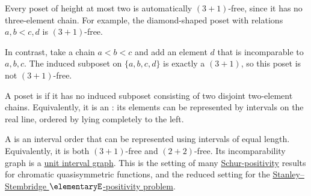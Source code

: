\begin{example*}
Every poset of height at most two is automatically $(3+1)$-free, since it has
no three-element chain.  For example, the diamond-shaped poset with
relations \(a,b\lt c,d\) is $(3+1)$-free.

In contrast, take a chain \(a\lt b\lt c\) and add an element \(d\) that is
incomparable to \(a,b,c\).  The induced subposet on
\(\{a,b,c,d\}\) is exactly a \((3+1)\), so this poset is not
$(3+1)$-free.
\end{example*}

A poset is \label{twoPlusTwoFreePoset} if it has no
induced subposet consisting of two disjoint two-element chains.  Equivalently,
it is an \label{intervalOrder}: its elements can be
represented by intervals on the real line, ordered by lying completely to the
left.

A \label{unitIntervalOrder} is an interval order
that can be represented using intervals of equal length.  Equivalently, it is
both $(3+1)$-free and $(2+2)$-free.  Its incomparability graph is a
\hyperref[chromaticQuasisymmetricUnitIntervalGraph]{unit interval graph}.
This is the setting of many
\hyperref[chromaticQuasisymmetricSchurExpansion]{Schur-positivity} results for
chromatic quasisymmetric functions, and the reduced setting for the
\hyperref[chromaticEExpansionConjectures]{Stanley--Stembridge
$\elementaryE$-positivity problem}.
